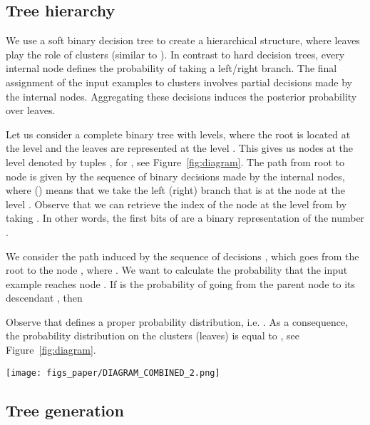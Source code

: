 \documentclass[runningheads]{llncs}
\def\our{CoHiClust}
\begin{document}
\subsection{Tree hierarchy}

We use a soft binary decision tree to create a hierarchical structure, where leaves play the role of clusters (similar to \cite{frosst2017distilling}). In contrast to hard decision trees, every internal node defines the probability of taking a left/right branch. The final assignment of the input examples to clusters involves partial decisions made by the internal nodes. Aggregating these decisions induces the posterior probability over leaves. 



Let us consider a complete binary tree with  levels, where the root is located at the level  and the leaves are represented at the level . This gives us  nodes at the level  denoted by tuples , for , see Figure~\ref{fig:diagram}. The path from root to node  is given by the sequence of binary decisions  made by the internal nodes, where  () means that we take the left (right) branch that is at the node at the level . Observe that we can retrieve the index  of the node at the level  from  by taking . In other words, the first  bits of  are a binary representation of the number .

We consider the path induced by the sequence of decisions , which goes from the root to the node , where . We want to calculate the probability  that the input example  reaches node . If  is the probability of going from the parent node  to its descendant , then

Observe that  defines a proper probability distribution, i.e. . As a consequence, the probability distribution on the clusters (leaves) is equal to , see Figure~\ref{fig:diagram}.


\begin{figure*}[!htb]
    \centering
\texttt{[image: figs\_paper/DIAGRAM\_COMBINED\_2.png]}
    \caption{{\bf Illustration of \our{}.} The output neurons of the projection head  (appended to the base network ) model decisions made by the internal tree nodes. The final assignment of the input example to the cluster (leaf node) is performed by aggregating edge probabilities located on the path from the root to this leaf. }
    \label{fig:diagram}
\end{figure*}




\subsection{Tree generation}
\end{document}
